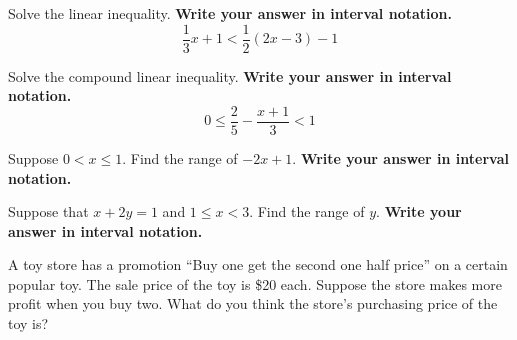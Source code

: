 \begin{exercise}

Solve the linear inequality. \textbf{Write your answer in interval
notation.} \[
\frac13x+1<\frac12(2x-3)-1
\]

\end{exercise}

\vspace*{6\baselineskip}

\begin{exercise}

Solve the compound linear inequality. \textbf{Write your answer in
interval notation.} \[
0\le \frac25-\frac{x+1}{3}< 1
\]

\end{exercise}

\vspace*{6\baselineskip}

\begin{exercise}

Suppose \(0< x \le 1\). Find the range of \(-2x+1\). \textbf{Write your
answer in interval notation.}

\end{exercise}

\vspace*{6\baselineskip}

\begin{exercise}

Suppose that \(x+2y=1\) and \(1\leq x< 3\). Find the range of \(y\).
\textbf{Write your answer in interval notation.}

\end{exercise}

\vspace*{6\baselineskip}

\begin{exercise}

A toy store has a promotion ``Buy one get the second one half price'' on
a certain popular toy. The sale price of the toy is \$20 each. Suppose
the store makes more profit when you buy two. What do you think the
store's purchasing price of the toy is?

\end{exercise}


